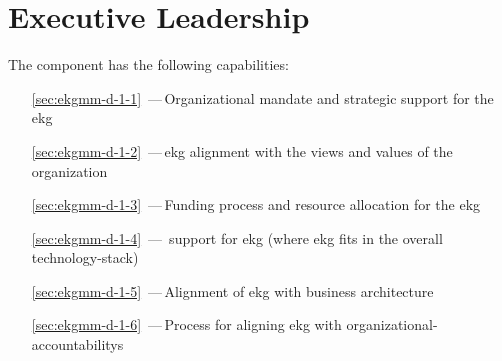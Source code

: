 \chapter{Executive Leadership}\label{ch:ekg-mm-d-1}

The  component has the following capabilities:

\begin{itemize}[leftmargin=.5in]
  \item [\ref{sec:ekgmm-d-1-1}] \,---\,Organizational mandate and strategic support for the \gls{ekg}
  \item [\ref{sec:ekgmm-d-1-2}] \,---\,\gls{ekg} alignment with the views and values of the organization
  \item [\ref{sec:ekgmm-d-1-3}] \,---\,Funding process and resource allocation for the \gls{ekg}
  \item [\ref{sec:ekgmm-d-1-4}] \,---\, support for \gls{ekg} (where \gls{ekg} fits in the overall \gls{technology-stack})
  \item [\ref{sec:ekgmm-d-1-5}] \,---\,Alignment of \gls{ekg} with business architecture
  \item [\ref{sec:ekgmm-d-1-6}] \,---\,Process for aligning \gls{ekg} with \glspl{organizational-accountability}
\end{itemize}







